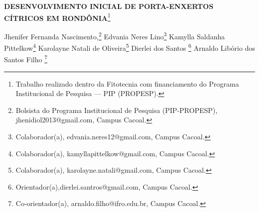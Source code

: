 \documentclass[article,12pt,onesidea,4paper,english,brazil]{abntex2}
\begin{document}
	
	
	\frenchspacing 
	
	\begin{center}
		\LARGE \textbf{DESENVOLVIMENTO INICIAL DE PORTA-ENXERTOS CÍTRICOS EM RONDÔNIA}\footnote{Trabalho realizado dentro da Fitotecnia com financiamento do Programa Institucional de Pesquisa — PIP (PROPESP).}
		
		\normalsize
	Jhenifer Fernanda Nascimento,\footnote{Bolsista do Programa Institucional de Pesquisa (PIP-PROPESP), jhenidiol2013@gmail.com, Campus Cacoal.} 
		Edvania Neres Lino\footnote{Colaborador(a), edvania.neres12@gmail.com, Campus Cacoal.} 
		Kamylla Saldanha Pittelkow\footnote{Colaborador(a), kamyllapittelkow@gmail.com, Campus Cacoal.} 
		Karolayne Natali de Oliveira\footnote{Colaborador(a), karolayne.natali@gmail.com, Campus Cacoal.}
		Dierlei dos Santos \footnote{Orientador(a),dierlei.santros@gmail.com, Campus Cacoal.}
		Arnaldo Libório dos Santos Filho \footnote{Co-orientador(a), arnaldo.filho@ifro.edu.br, Campus Cacoal.} 
	\end{center}
	
\end{document}
